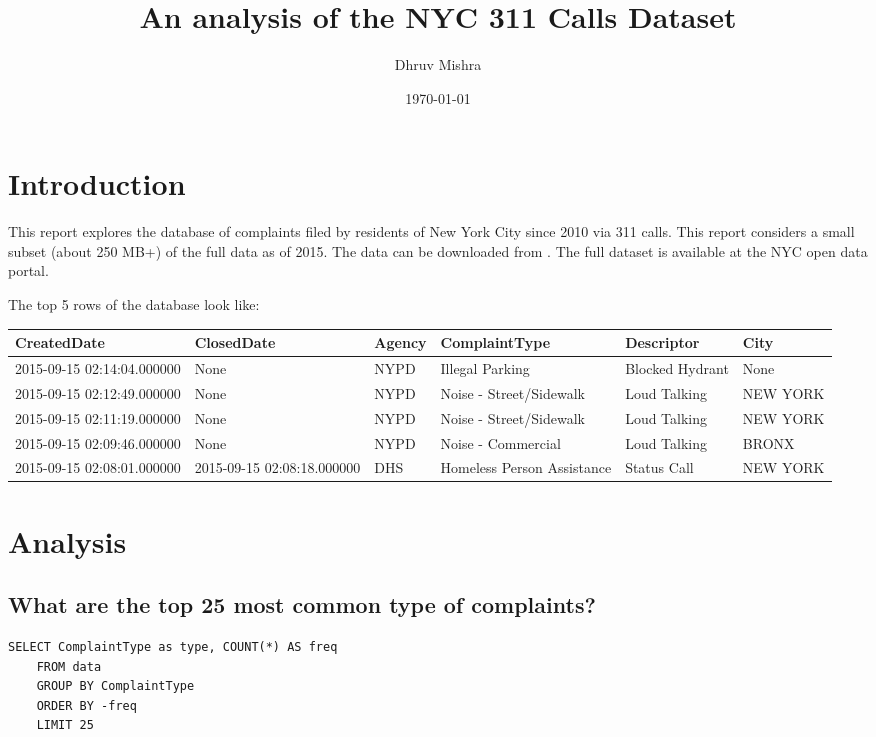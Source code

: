 \documentclass[12pt,a4paper]{article}
\begin{document}
\title{An analysis of the NYC 311 Calls Dataset}
\author{Dhruv Mishra}
\date{\today}

\maketitle


\vspace{+10mm}
\tableofcontents


\vspace{+10mm}
\section{Introduction}
This report explores the database of complaints filed by residents of New York City since 2010 via 311 calls. This report considers a small subset (about 250 MB+) of the full data as of 2015. The data can be downloaded from \cite{subset}. The full dataset is available at the NYC open data portal\cite{nycdatafull}.

The top 5 rows of the database look like:
\begin{center}
 \begin{tabular}{||p{3cm} p{3cm} p{1cm} p{3cm} p{3cm} p{1.5cm}||}
 \hline
 CreatedDate & ClosedDate & Agency & ComplaintType & Descriptor & City \\ [0.5ex]
 \hline\hline
 2015-09-15 02:14:04.000000 & None & NYPD & Illegal Parking & Blocked Hydrant & None \\
 \hline
 2015-09-15 02:12:49.000000 & None & NYPD & Noise - Street/Sidewalk & Loud Talking & NEW YORK \\
 \hline
 2015-09-15 02:11:19.000000 & None & NYPD & Noise - Street/Sidewalk & Loud Talking & NEW YORK \\
 \hline
 2015-09-15 02:09:46.000000 & None & NYPD & Noise - Commercial & Loud Talking & BRONX \\
 \hline
 2015-09-15 02:08:01.000000 & 2015-09-15 02:08:18.000000 & DHS & Homeless Person Assistance & Status Call  & NEW YORK \\ [1ex]
 \hline
\end{tabular}
\end{center}

\section{Analysis}
\subsection{What are the top 25 most common type of complaints?}
\begin{verbatim}
SELECT ComplaintType as type, COUNT(*) AS freq
    FROM data
    GROUP BY ComplaintType
    ORDER BY -freq
    LIMIT 25
\end{verbatim}
\end{document}
